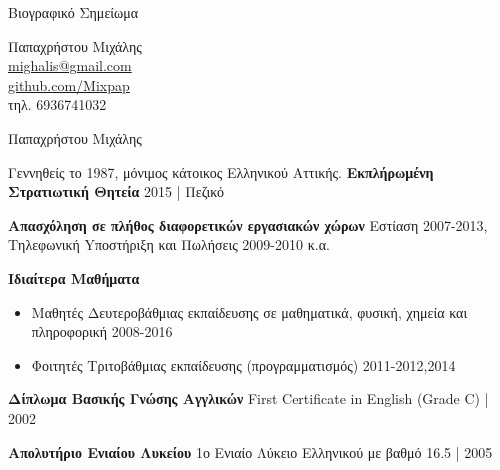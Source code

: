 \documentclass[a4paper,12pt,final]{memoir}
\newcommand{\SmallSep}{\vspace{0.25em}}
\newenvironment{AboutMe}
	{\ignorespaces\textbf{\color{RoyalBlue} \textbullet{}}}
\newcommand{\CVSection}[1]
	{\Large{#1}\par
	\SmallSep\normalsize\normalfont}
\newcommand{\CVItem}[2]
	{\textbf{\color{RoyalBlue} #1} #2}
\newcommand{\location}[1]{ %
\small{\color{headings}#1}}
\newenvironment{tightitemize} %
{\vspace{-\topsep}\begin{itemize}\itemsep1pt \parskip0pt \parsep0pt}
{\end{itemize}\vspace{-\topsep}}
\begin{document}
\begin{flushright}
Βιογραφικό Σημείωμα
\vspace{0.75cm}

\small
	Παπαχρήστου Μιχάλης \\
	\url{mighalis@gmail.com}  \\
	\url{github.com/Mixpap} \\
	τηλ. 6936741032
\end{flushright}\normalsize
\framebreak


\Huge {\color{RoyalBlue} Παπαχρήστου Μιχάλης} \\

\normalsize\normalfont

\begin{AboutMe}
Γεννηθείς το 1987, μόνιμος κάτοικος Ελληνικού Αττικής. 
\end{AboutMe}

\SmallSep
\CVItem{Εκπλήρωμένη Στρατιωτική Θητεία}{}
\location{2015 | Πεζικό}


\SmallSep

\CVItem{Aπασχόληση σε πλήθος διαφορετικών εργασιακών χώρων}{\newline}
\location{Eστίαση 2007-2013, Tηλεφωνική Yποστήριξη και Πωλήσεις 2009-2010 κ.α.}


\CVItem{Ιδιαίτερα Μαθήματα}{}
\begin{tightitemize}
	\item Μαθητές Δευτεροβάθμιας εκπαίδευσης σε μαθηματικά, φυσική, χημεία και πληροφορική \location{2008-2016}
	\item Φοιτητές Τριτοβάθμιας εκπαίδευσης (προγραμματισμός)
	\location{2011-2012,2014}
\end{tightitemize}
\SmallSep

\CVItem{Δίπλωμα Βασικής Γνώσης Αγγλικών}{\newline}
\location{First Certificate in English (Grade C) | 2002}
\SmallSep

\CVItem{Απολυτήριο Ενιαίου Λυκείου}{\newline}
\location{1ο Ενιαίο Λύκειο Ελληνικού με βαθμό 16.5 | 2005}
\SmallSep
\end{document}
